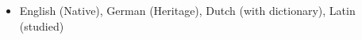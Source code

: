  \begin{small} \color{black} 
   \begin{itemize}[noitemsep,topsep=0pt,parsep=0pt,partopsep=0pt]
    \item[] English (Native), German (Heritage), Dutch (with dictionary), Latin (studied)
\end{itemize} 
\end{small}
